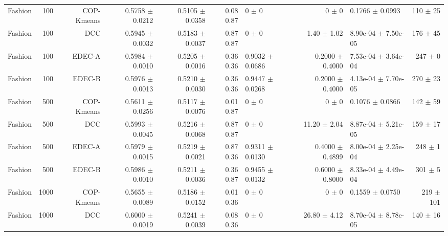 \begin{table}[ht]
{\begin{tabular}{ | r | r | r | r | r | r | H  r | H  r |}
Fashion & 100 & COP-Kmeans & { \color{blue} 0.5758 $\pm$ 0.0212} & { \color{blue} 0.5105 $\pm$ 0.0358} & { \color{black}0.08} { \color{black}0.87} & 0 $\pm$ 0 & 0 $\pm$ 0 & 0.1766 $\pm$ 0.0993 & 110 $\pm$ 25 \\ 
Fashion & 100 & DCC & { \color{blue} 0.5945 $\pm$ 0.0032} & { \color{blue} 0.5183 $\pm$ 0.0037} & { \color{black}0.87} { \color{green} 0.87} & 0 $\pm$ 0 & 1.40 $\pm$ 1.02 & 8.90e-04 $\pm$ 7.50e-05 & 176 $\pm$ 45 \\ 
Fashion & 100 & EDEC-A & { \color{green} 0.5984 $\pm$ 0.0010} & { \color{blue} 0.5205 $\pm$ 0.0016} & { \color{green} 0.36} { \color{green} 0.36} & 0.9032 $\pm$ 0.0686 & 0.2000 $\pm$ 0.4000 & 7.53e-04 $\pm$ 3.64e-04 & 247 $\pm$ 0 \\ 
Fashion & 100 & EDEC-B & { \color{blue} 0.5976 $\pm$ 0.0013} & { \color{green} 0.5210 $\pm$ 0.0030} & { \color{green} 0.36} { \color{green} 0.36} & 0.9447 $\pm$ 0.0268 & 0.2000 $\pm$ 0.4000 & 4.13e-04 $\pm$ 7.70e-05 & 270 $\pm$ 23 \\ \hline 
Fashion & 500 & COP-Kmeans & 0.5611 $\pm$ 0.0256 & { \color{blue} 0.5117 $\pm$ 0.0076} & { \color{black}0.01} { \color{black}0.87} & 0 $\pm$ 0 & 0 $\pm$ 0 & 0.1076 $\pm$ 0.0866 & 142 $\pm$ 59 \\ 
Fashion & 500 & DCC & { \color{green} 0.5993 $\pm$ 0.0045} & { \color{blue} 0.5216 $\pm$ 0.0068} & { \color{green} 0.87} { \color{green} 0.87} & 0 $\pm$ 0 & 11.20 $\pm$ 2.04 & 8.87e-04 $\pm$ 5.21e-05 & 159 $\pm$ 17 \\ 
Fashion & 500 & EDEC-A & { \color{blue} 0.5979 $\pm$ 0.0015} & { \color{green} 0.5219 $\pm$ 0.0021} & { \color{green} 0.87} { \color{green} 0.36} & 0.9311 $\pm$ 0.0130 & 0.4000 $\pm$ 0.4899 & 8.00e-04 $\pm$ 2.25e-04 & 248 $\pm$ 1 \\ 
Fashion & 500 & EDEC-B & { \color{blue} 0.5986 $\pm$ 0.0010} & { \color{blue} 0.5211 $\pm$ 0.0036} & { \color{green} 0.36} { \color{green} 0.87} & 0.9455 $\pm$ 0.0132 & 0.6000 $\pm$ 0.8000 & 8.33e-04 $\pm$ 4.49e-04 & 301 $\pm$ 5 \\ \hline 
Fashion & 1000 & COP-Kmeans & 0.5655 $\pm$ 0.0089 & { \color{blue} 0.5186 $\pm$ 0.0152} & { \color{black}0.01} { \color{green} 0.36} & 0 $\pm$ 0 & 0 $\pm$ 0 & 0.1559 $\pm$ 0.0750 & 219 $\pm$ 101 \\ 
Fashion & 1000 & DCC & { \color{blue} 0.6000 $\pm$ 0.0019} & { \color{blue} 0.5241 $\pm$ 0.0039} & { \color{green} 0.08} { \color{green} 0.36} & 0 $\pm$ 0 & 26.80 $\pm$ 4.12 & 8.70e-04 $\pm$ 8.78e-05 & 140 $\pm$ 16 \\ 

\end{tabular}}
\end{table}
